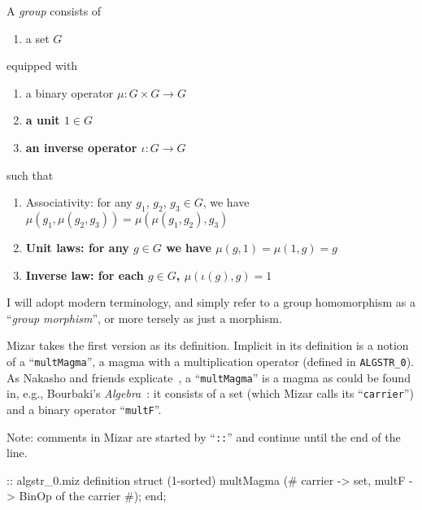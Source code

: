 \begin{definition}[Version 2]
  A \emph{group} consists of
  \begin{enumerate}
  \item a set $G$
  \end{enumerate}
  equipped with
  \begin{enumerate}
  \item a binary operator $\mu\colon G\times G\to G$
  \item \textbf{a unit $1\in G$}
  \item \textbf{an inverse operator $\iota\colon G\to G$}
  \end{enumerate}
  such that
  \begin{enumerate}
  \item Associativity: for any $g_{1}$, $g_{2}$, $g_{3}\in G$, we have
    $\mu(g_{1}, \mu(g_{2},g_{3})) = \mu(\mu(g_{1},g_{2}),g_{3})$
  \item \textbf{Unit laws: for any $g\in G$ we have $\mu(g,1)=\mu(1,g)=g$}
  \item \textbf{Inverse law: for each $g\in G$, $\mu(\iota(g),g)=1$}
  \end{enumerate}
\end{definition}

\begin{remark}
I will adopt modern terminology, and simply refer to a group
homomorphism as a ``\emph{group morphism}'', or more tersely as just a
morphism.
\end{remark}

\M{} Mizar takes the first version as its definition. Implicit in its
definition is a notion of a ``\verb#multMagma#'', a magma with a
multiplication operator (defined in \verb#ALGSTR_0#). As Nakasho and
friends explicate~\cite{nakasho2014formalization}, a ``\verb#multMagma#''
is a magma as could be found in, e.g., Bourbaki's
\emph{Algebra}~\cite[see Ch.I\S1.1]{bourbaki1974elements}: it
consists of a set (which Mizar calls its ``\verb#carrier#'') and a
binary operator ``\verb#multF#''.

Note: comments in Mizar are started by ``\verb#::#'' and continue until
the end of the line.

\begin{mizar}
:: algstr_0.miz
definition
  struct (1-sorted) multMagma (# carrier -> set,
  multF -> BinOp of the carrier
  #);
end;
\end{mizar}

